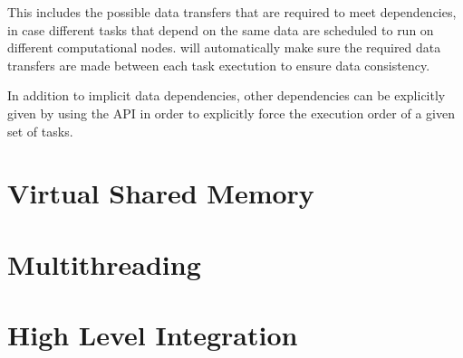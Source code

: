 \documentclass[main.tex]{subfiles}
\begin{document}
This includes the possible data transfers that are required to meet dependencies, in case different tasks that depend on the same data are scheduled to run on different computational nodes. \starpu will automatically make sure the required data transfers are made between each task exectution to ensure data consistency.

In addition to implicit data dependencies, other dependencies can be explicitly given by using the \starpu API in order to explicitly force the execution order of a given set of tasks.

\section{Virtual Shared Memory}
\section{Multithreading}
\section{High Level Integration}


\end{document}
